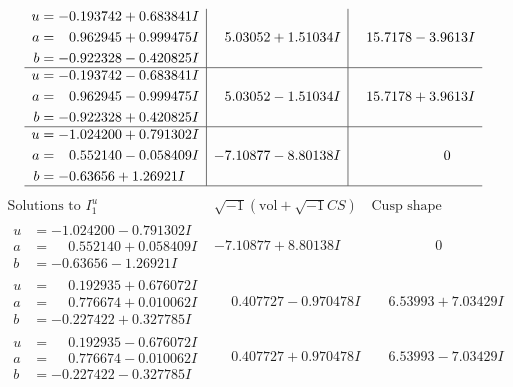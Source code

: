 \documentclass[1p]{elsarticle_modified}
\theoremstyle{definition}
\newcommand{\I}{\sqrt{-1}}
\begin{document}
$$\begin{array}{c|c|c}
\begin{aligned}
u &= -0.193742 + 0.683841 I \\
a &= \phantom{-}0.962945 + 0.999475 I \\
b &= -0.922328 - 0.420825 I\end{aligned}
 & \phantom{-}5.03052 + 1.51034 I & \phantom{-}15.7178 - 3.9613 I \\ \hline\begin{aligned}
u &= -0.193742 - 0.683841 I \\
a &= \phantom{-}0.962945 - 0.999475 I \\
b &= -0.922328 + 0.420825 I\end{aligned}
 & \phantom{-}5.03052 - 1.51034 I & \phantom{-}15.7178 + 3.9613 I \\ \hline\begin{aligned}
u &= -1.024200 + 0.791302 I \\
a &= \phantom{-}0.552140 - 0.058409 I \\
b &= -0.63656 + 1.26921 I\end{aligned}
 & -7.10877 - 8.80138 I & \phantom{-0.000000 } 0\\
 \hline 
 \end{array}$$\newpage$$\begin{array}{c|c|c}  
\text{Solutions to }I^u_{1}& \I (\text{vol} + \sqrt{-1}CS) & \text{Cusp shape}\\
 \hline 
\begin{aligned}
u &= -1.024200 - 0.791302 I \\
a &= \phantom{-}0.552140 + 0.058409 I \\
b &= -0.63656 - 1.26921 I\end{aligned}
 & -7.10877 + 8.80138 I & \phantom{-0.000000 } 0 \\ \hline\begin{aligned}
u &= \phantom{-}0.192935 + 0.676072 I \\
a &= \phantom{-}0.776674 + 0.010062 I \\
b &= -0.227422 + 0.327785 I\end{aligned}
 & \phantom{-}0.407727 - 0.970478 I & \phantom{-}6.53993 + 7.03429 I \\ \hline\begin{aligned}
u &= \phantom{-}0.192935 - 0.676072 I \\
a &= \phantom{-}0.776674 - 0.010062 I \\
b &= -0.227422 - 0.327785 I\end{aligned}
 & \phantom{-}0.407727 + 0.970478 I & \phantom{-}6.53993 - 7.03429 I \\ \hline\begin{aligned}

\end{aligned}
\end{array}$$
\end{document}
